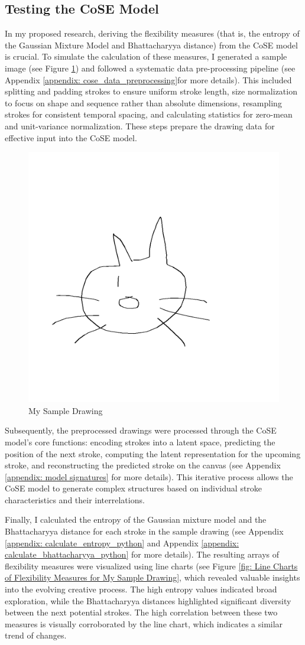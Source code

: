 \documentclass[../Proposal.tex]{subfiles}
\begin{document}
\subsection*{Testing the CoSE Model}
In my proposed research, deriving the flexibility measures (that is, the entropy of the Gaussian Mixture Model and Bhattacharyya distance) from the CoSE model is crucial. To simulate the calculation of these measures, I generated a sample image (see Figure \ref{fig: My Sample Drawing}) and followed a systematic data pre-processing pipeline (see Appendix \ref{appendix: cose_data_preprocessing}for more details). This included splitting and padding strokes to ensure uniform stroke length, size normalization to focus on shape and sequence rather than absolute dimensions, resampling strokes for consistent temporal spacing, and calculating statistics for zero-mean and unit-variance normalization. These steps prepare the drawing data for effective input into the CoSE model. 

\begin{figure}[ht]
    \centering
    \includegraphics[width=0.5\linewidth, keepaspectratio]{screenshots/my_sample_drawing.png}
    \caption{My Sample Drawing}
    \label{fig: My Sample Drawing}
\end{figure}

Subsequently, the preprocessed drawings were processed through the CoSE model's core functions: encoding strokes into a latent space, predicting the position of the next stroke, computing the latent representation for the upcoming stroke, and reconstructing the predicted stroke on the canvas (see Appendix \ref{appendix: model signatures} for more details). This iterative process allows the CoSE model to generate complex structures based on individual stroke characteristics and their interrelations. 

Finally, I calculated the entropy of the Gaussian mixture model and the Bhattacharyya distance for each stroke in the sample drawing (see Appendix \ref{appendix: calculate_entropy_python} and Appendix \ref{appendix: calculate_bhattacharyya_python} for more details). The resulting arrays of flexibility measures were visualized using line charts (see Figure \ref{fig: Line Charts of Flexibility Measures for My Sample Drawing}, which revealed valuable insights into the evolving creative process. The high entropy values indicated broad exploration, while the Bhattacharyya distances highlighted significant diversity between the next potential strokes. The high correlation between these two measures is visually corroborated by the line chart, which indicates a similar trend of changes. 
\end{document}
